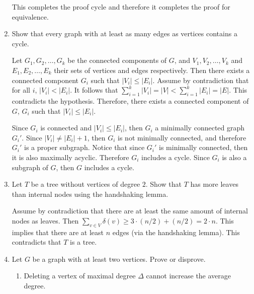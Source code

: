 \begin{enumerate}
        This completes the proof cycle and therefore it completes the proof for equivalence.
        
        \item Show that every graph with at least as many edges as vertices contains a cycle.
        \vspace{1em}
        
        Let $G_1, G_2, \ldots, G_k$ be the connected components of $G$, and $V_1,V_2, \ldots, V_k$ and $E_1,E_2, \ldots, E_k$ their sets of vertices and edges respectively. Then there exists a connected component $G_i$ such that $\vert V_i \vert \leq \vert E_i \vert$. Assume by contradiction that for all $i$, $\vert V_i \vert < \vert E_i \vert$. It follows that $\displaystyle\sum\limits_{i=1}^{k} \vert V_i \vert = \vert V \vert < \displaystyle\sum \limits_{i=1}^{k} \vert E_i \vert = \vert E \vert$. This contradicts the hypothesis. Therefore, there exists a connected component of $G$, $G_i$ such that $\vert V_i \vert \leq \vert E_i \vert$.
        
        Since $G_i$ is connected and $\vert V_i \vert \leq \vert E_i \vert$, then $G_i$ a minimally connected graph $G_i'$. Since $\vert V_i\vert \neq \vert E_i \vert + 1$, then $G_i$ is not minimally connected, and therefore $G_i'$ is a proper subgraph. Notice that since $G_i'$ is minimally connected, then it is also maximally acyclic. Therefore $G_i$ includes a cycle. Since $G_i$ is also a subgraph of $G$, then $G$ includes a cycle.
        
        \item Let $T$ be a tree without vertices of degree $2$. Show that $T$ has more leaves than internal nodes using the handshaking lemma.
        \vspace{1em}
        
        Assume by contradiction that there are at least the same amount of internal nodes as leaves. Then $\displaystyle\sum\limits_{v\in V}\delta(v)\geq 3 \cdot (n/2) + (n/2) = 2 \cdot n$. This implies that there are at least $n$ edges (via the handshaking lemma). This contradicts that $T$ is a tree.
        
        \item Let $G$ be a graph with at least two vertices. Prove or disprove.
        
        \begin{enumerate}
            \item Deleting a vertex of maximal degree $\Delta$ cannot increase the average degree.
            

\end{enumerate}
\end{enumerate}
